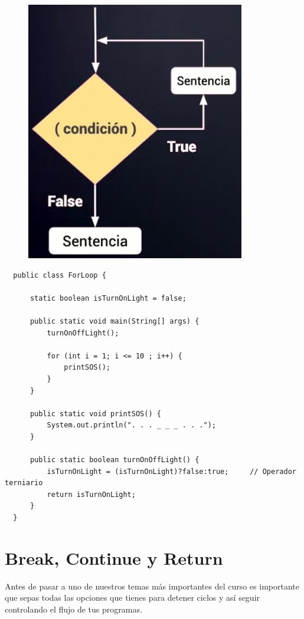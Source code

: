 \documentclass{article}
\begin{document}
\begin{figure}[h!]
  \centering
  \includegraphics[scale=0.75]{./Pictures/029_for.png}
\end{figure}

\begin{verbatim}
  public class ForLoop {

      static boolean isTurnOnLight = false;

      public static void main(String[] args) {
          turnOnOffLight();

          for (int i = 1; i <= 10 ; i++) {
              printSOS();
          }
      }

      public static void printSOS() {
          System.out.println(". . . _ _ _ . . .");
      }

      public static boolean turnOnOffLight() {
          isTurnOnLight = (isTurnOnLight)?false:true;     // Operador terniario
          return isTurnOnLight;
      }
  }
\end{verbatim}


\section{Break, Continue y Return}%
Antes de pasar a uno de nuestros temas más importantes del curso es importante
que sepas todas las opciones que tienes para detener ciclos y así seguir
controlando el flujo de tus programas.
\end{document}
